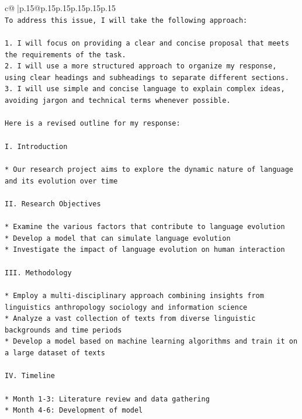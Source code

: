\documentclass{article}
\begin{document}
{\begin{supertabular}{c@{$\;$}|p{.15\linewidth}@{}p{.15\linewidth}p{.15\linewidth}p{.15\linewidth}p{.15\linewidth}p{.15\linewidth}}
{{{\\ 
\texttt{To address this issue, I will take the following approach:} \\
\\ 
\texttt{1. I will focus on providing a clear and concise proposal that meets the requirements of the task.} \\
\texttt{2. I will use a more structured approach to organize my response, using clear headings and subheadings to separate different sections.} \\
\texttt{3. I will use simple and concise language to explain complex ideas, avoiding jargon and technical terms whenever possible.} \\
\\ 
\texttt{Here is a revised outline for my response:} \\
\\ 
\texttt{I. Introduction} \\
\\ 
\texttt{* Our research project aims to explore the dynamic nature of language and its evolution over time} \\
\\ 
\texttt{II. Research Objectives} \\
\\ 
\texttt{* Examine the various factors that contribute to language evolution} \\
\texttt{* Develop a model that can simulate language evolution} \\
\texttt{* Investigate the impact of language evolution on human interaction} \\
\\ 
\texttt{III. Methodology} \\
\\ 
\texttt{* Employ a multi{-}disciplinary approach combining insights from linguistics anthropology sociology and information science} \\
\texttt{* Analyze a vast collection of texts from diverse linguistic backgrounds and time periods} \\
\texttt{* Develop a model based on machine learning algorithms and train it on a large dataset of texts} \\
\\ 
\texttt{IV. Timeline} \\
\\ 
\texttt{* Month 1{-}3: Literature review and data gathering} \\
\texttt{* Month 4{-}6: Development of model} \\
}}}
\end{supertabular}}
\end{document}
